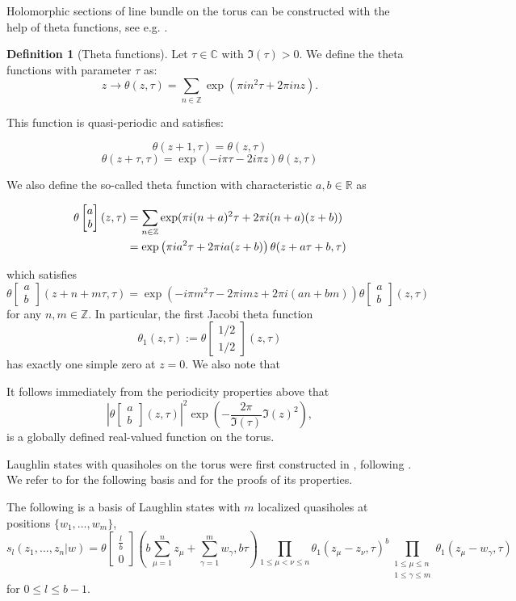 \documentclass{article}
\theoremstyle{definition}
\newcounter{sharedcounter}[section]
\newtheorem{definition}[sharedcounter]{Definition}
\newcommand{\chara}[2]{\begin{bmatrix} #1 \\ #2 \end{bmatrix}}
\newcommand{\eq}[2][1]{
\begin{equation*}
	\addtolength{\fboxsep}{0pt}
	\begin{alignedat}{#1}
	#2
	\end{alignedat}
\end{equation*}
}
\renewcommand{\leq}{\leqslant}
\begin{document}
Holomorphic sections of line bundle on the torus can be constructed with the help of theta functions, see e.g. \cite{mumford1983tata}. 
\begin{definition}[Theta functions]
Let $\tau \in \mathbb{C}$ with $\Im(\tau)>0$. We define the theta functions with parameter $\tau$ as:
$$z \to \theta(z,\tau)=\sum_{n\in\mathbb{Z}} \exp(\pi i n^2 \tau + 2 \pi i n z).$$

\end{definition}

This function is quasi-periodic and satisfies:

$$\theta(z+1,\tau)=\theta(z,\tau)$$
$$\theta(z+\tau,\tau)=\exp(-i\pi\tau -2i\pi z)\theta(z,\tau)$$

We also define the so-called theta function with characteristic $a,b\in\mathbb R$ as
\eq{
\theta \chara{a}{b}(z,\tau)&= \sum_{n\in\mathbb{Z}} \exp(\pi i(n + a)^2\tau + 2\pi i(n + a)(z + b))\\
&=\exp \left( \pi i a^2 \tau + 2\pi i a(z+b) \right) \theta(z+a\tau+b,\tau)
}
which satisfies
\begin{equation}
    \label{eq:thetashift}
\theta \chara{a}{b}(z+n+m\tau,\tau)=\exp(-i\pi m^2 \tau - 2\pi i m z +2\pi i (an+bm)) \theta \chara{a}{b}(z,\tau)
\end{equation}
 for any $n,m \in \mathbb{Z}$. In particular, the first Jacobi theta function
 $$
\theta_1(z,\tau):=\theta \chara{1/2}{1/2}(z,\tau)
$$ 
has exactly one simple zero at $z=0$. We also note that
\begin{proposition}
It follows immediately from the periodicity properties above that
\label{prop:theta}
$$\left|\theta \chara{a}{b}(z,\tau)\right|^2\exp\left(-\frac{2\pi}{\Im(\tau)} \Im(z)^2\right),$$
is a globally defined real-valued function on the torus.
\end{proposition}


Laughlin states with quasiholes on the torus were first constructed in \cite{Einarsson1990}, following \cite{Haldane1985}. 
We refer to \cite{Klevtsov_2016,Burban_Klevtsov_2025,burban2024norms} for the following basis and for the proofs of its properties.

\begin{proposition}
\label{prop:basisgenusone}
The following is a basis of Laughlin states with $m$ localized quasiholes at positions $\{w_1,\dots,w_m\}$,
$$s_{l}(z_1,\dots,z_n|w)=\theta \chara{\frac{l}{b}}{0} \left(b\sum_{\mu=1}^n z_\mu + \sum_{\gamma=1}^m w_\gamma,b\tau\right) \prod_{ 1\leqslant\mu<\nu\leqslant n} \theta_1(z_\mu - z_\nu,\tau)^b \prod_{\substack{1\leqslant\mu\leqslant n\\1\leqslant\gamma\leqslant m}}\theta_1(z_\mu-w_\gamma,\tau)$$ for $0\leq l \leq b-1$.

\end{proposition}
\end{document}
